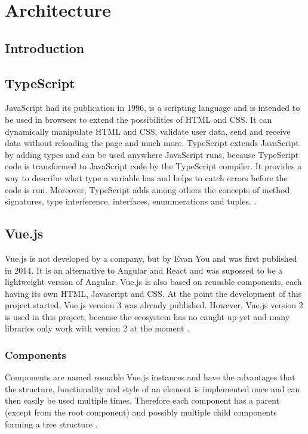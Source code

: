 \chapter{Architecture}
\label{chapter:architecture}

\section{Introduction}
\label{section:introduction}

\section{TypeScript}
\label{section:typescript}
JavaScript had its publication in 1996, is a scripting language and is intended to be used in browsers to extend the possibilities of HTML and CSS. It can dynamically manipulate HTML and CSS, validate user data, send and receive data without reloading the page and much more.
TypeScript extends JavaScript by adding types and can be used anywhere JavaScript runs, because TypeScript code is transformed to JavaScript code by the TypeScript compiler. It provides a way to describe what type a variable has and helps to catch errors before the code is run. Moreover, TypeScript adds among others the concepts of method signatures, type interference, interfaces, enummerations and tuples. \cite{Typescript}.

\section{Vue.js}
\label{section:vuejs}
Vue.js is not developed by a company, but by Evan You and was first published in 2014. It is an alternative to Angular and React and was supossed to be a lightweight version of Angular. Vue.js is also based on reusable components, each having its own HTML, Javascript and CSS.
At the point the development of this project started, Vue.js version 3 was already published. However, Vue.js version 2 is used in this project, because the ecosystem has no caught up yet and many libraries only work with version 2 at the moment \cite{Vue}.

\subsection{Components}
Components are named resuable Vue.js instances and have the advantages that the structure, functionality and style of an element is implemented once and can then easily be used multiple times. Therefore each component has a parent (except from the root component) and possibly multiple child components forming a tree structure \cite{Vue}. 

